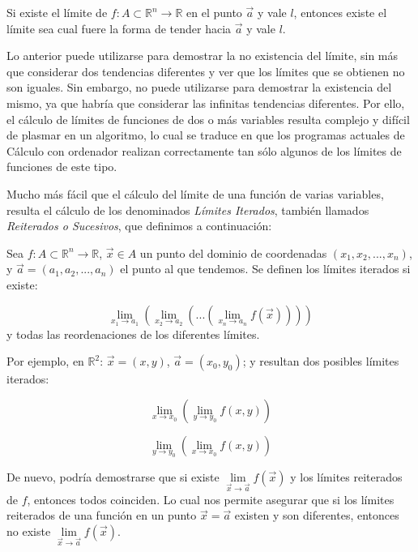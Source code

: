 \begin{teorema}
Si existe el límite de $f: A \subset \mathbb{R}^n  \to \mathbb{R}$
en el punto $\vec a$ y vale $l$, entonces existe el límite sea
cual fuere la forma de tender hacia $\vec a$ y vale $l$.
\end{teorema}

Lo anterior puede utilizarse para demostrar la no existencia del
límite, sin más que considerar dos tendencias diferentes y ver que
los límites que se obtienen no son iguales. Sin embargo, no puede
utilizarse para demostrar la existencia del mismo, ya que habría
que considerar las infinitas tendencias diferentes. Por ello, el
cálculo de límites de funciones de dos o más variables resulta
complejo y difícil de plasmar en un algoritmo, lo cual se traduce
en que los programas actuales de Cálculo con ordenador realizan
correctamente tan sólo algunos de los límites de funciones de este
tipo.

Mucho más fácil que el cálculo del límite de una función de varias
variables, resulta el cálculo de los denominados \emph{Límites
Iterados}, también llamados \emph{Reiterados o Sucesivos}, que
definimos a continuación:

Sea $f: A \subset \mathbb{R}^n  \to \mathbb{R}$, $\vec x \in A$ un
punto del dominio de coordenadas $\left(x_1,x_2,...,x_n\right)$, y
$\vec a=\left(a_1,a_2,...,a_n\right)$ el punto al que tendemos. Se
definen los límites iterados si existe:

\[
\mathop {\lim }\limits_{x_1  \to a_1 } \left( {\mathop {\lim
}\limits_{x_2  \to a_2 } \left( {...\left( {\mathop {\lim
}\limits_{x_n  \to a_n } f\left( {\vec x} \right)} \right)}
\right)} \right)
\]
y todas las reordenaciones de los diferentes límites.

Por ejemplo, en $\mathbb R^2$: $\vec x=(x,y)$, $\vec a=(x_0,y_0)$;
y resultan dos posibles límites iterados:


\[
\mathop {\lim }\limits_{x \to x_0 } \left( {\mathop {\lim
}\limits_{y \to y_0 } f(x,y)} \right)
\]

\[
\mathop {\lim }\limits_{y \to y_0 } \left( {\mathop {\lim
}\limits_{x \to x_0 } f(x,y)} \right)
\]

De nuevo, podría demostrarse que si existe $ \mathop {\lim
}\limits_{\vec x \to \vec a} f\left( {\vec x} \right)$ y los
límites reiterados de $f$, entonces todos coinciden. Lo cual nos
permite asegurar que si los límites reiterados de una función en
un punto $\vec x =\vec a$ existen y son diferentes, entonces no
existe $ \mathop {\lim }\limits_{\vec x \to \vec a} f\left( {\vec
x} \right)$.

